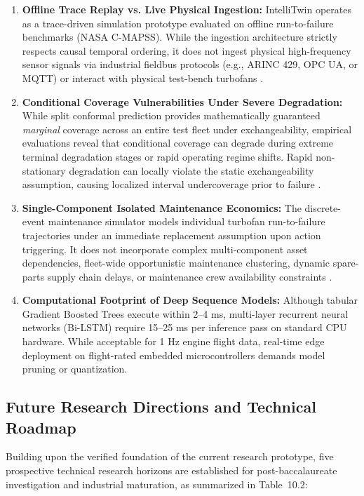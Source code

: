 \documentclass[12pt,a4paper]{article}
\begin{document}
\begin{enumerate}[label=\textbf{\arabic*.}]
    \item \textbf{Offline Trace Replay vs. Live Physical Ingestion:} IntelliTwin operates as a trace-driven simulation prototype evaluated on offline run-to-failure benchmarks (NASA C-MAPSS). While the ingestion architecture strictly respects causal temporal ordering, it does not ingest physical high-frequency sensor signals via industrial fieldbus protocols (e.g., ARINC 429, OPC UA, or MQTT) or interact with physical test-bench turbofans \cite{walia2026digital}.
    \item \textbf{Conditional Coverage Vulnerabilities Under Severe Degradation:} While split conformal prediction provides mathematically guaranteed \textit{marginal} coverage across an entire test fleet under exchangeability, empirical evaluations reveal that conditional coverage can degrade during extreme terminal degradation stages or rapid operating regime shifts. Rapid non-stationary degradation can locally violate the static exchangeability assumption, causing localized interval undercoverage prior to failure \cite{javanmardi2023conformal}.
    \item \textbf{Single-Component Isolated Maintenance Economics:} The discrete-event maintenance simulator models individual turbofan run-to-failure trajectories under an immediate replacement assumption upon action triggering. It does not incorporate complex multi-component asset dependencies, fleet-wide opportunistic maintenance clustering, dynamic spare-parts supply chain delays, or maintenance crew availability constraints \cite{cortesgomez2025predictive}.
    \item \textbf{Computational Footprint of Deep Sequence Models:} Although tabular Gradient Boosted Trees execute within 2--4 ms, multi-layer recurrent neural networks (Bi-LSTM) require 15--25 ms per inference pass on standard CPU hardware. While acceptable for 1 Hz engine flight data, real-time edge deployment on flight-rated embedded microcontrollers demands model pruning or quantization.
\end{enumerate}

\subsection{Future Research Directions and Technical Roadmap}
Building upon the verified foundation of the current research prototype, five prospective technical research horizons are established for post-baccalaureate investigation and industrial maturation, as summarized in Table~10.2:
\end{document}
